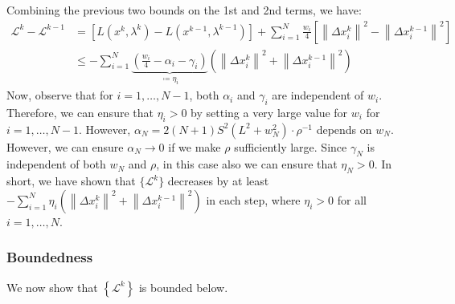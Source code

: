 \documentclass[11pt]{article}
\newcommand{\norm}[1]{\left\lVert #1 \right\rVert}
\begin{document}
Combining the previous two bounds on the 1st and 2nd terms, we have:
\begin{align*}
\mathcal{L}^k - \mathcal{L}^{k-1} &= \left[ L(x^k, \lambda^k) - L(x^{k-1}, \lambda^{k-1}) \right] + \sum_{i=1}^N \frac{w_i}{4} \left[\norm{\Delta x_i^k}^2 - \norm{\Delta x_i^{k-1}}^2 \right] \\
&\leq -\sum_{i=1}^N \underset{\coloneqq \eta_i}{\underbrace{\left(\frac{w_i}{4} - \alpha_i - \gamma_i\right)}}\left(\norm{\Delta x_i^k}^2 + \norm{\Delta x_i^{k-1}}^2\right) 
\end{align*}
Now, observe that for $i =1, \ldots, N-1$, both $\alpha_i$ and $\gamma_i$ are independent of $w_i$. Therefore, we can ensure that $\eta_i > 0$ by setting a very large value for $w_i$ for $i = 1, \ldots, N-1$.
However, $\alpha_N = 2(N+1)S^2(L^2 + w_N^2)\cdot \rho^{-1}$ depends on $w_N$. However, we can ensure $\alpha_N \to 0$ if we make $\rho$ sufficiently large. 
Since $\gamma_N$ is independent of both $w_N$ and $\rho$, in this case also we can ensure that $\eta_N > 0$.
In short, we have shown that $\{\mathcal{L}^k\}$ decreases by at least $-\sum_{i=1}^N \eta_i \left(\norm{\Delta x_i^k}^2 + \norm{\Delta x_i^{k-1}}^2\right)$ in each step, where $\eta_i > 0$ for all $i = 1, \ldots, N$.

\subsubsection{Boundedness}\label{sec:lyapunov_bounded}
We now show that $\left\{\mathcal{L}^k\right\}$ is bounded below.
\end{document}
